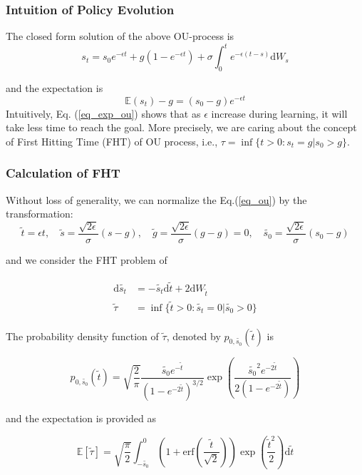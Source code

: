 \documentclass[10pt,hyperref={CJKbookmarks=true},envcountsect,mathserif]{beamer}
\begin{document}
\begin{frame}
	\frametitle{Intuition of Policy Evolution}
	The closed form solution of the above OU-process is 
	\begin{equation}
		s_t = s_0 e^{-\epsilon t} + g (1-e^{-\epsilon t}) + \sigma \int_0^t e^{-\epsilon(t-s)}\mathrm{d}W_s
	\end{equation}

and the expectation is
	\begin{equation}
	\label{eq_exp_ou}
		\mathbb{E}(s_t) - g = (s_0 - g )e^{-\epsilon t}
	\end{equation}
	Intuitively, Eq. (\ref{eq_exp_ou}) shows that as $\epsilon$ increase during learning, it will take less time to reach the goal. More precisely, we are caring about the concept of First Hitting Time (FHT) of OU process, i.e., $\tau = \inf\{{t>0: s_t = g|s_0 > g}\}$. 

\end{frame}

\begin{frame}
	\frametitle{Calculation of FHT}
	Without loss of generality, we can normalize the Eq.(\ref{eq_ou}) by the transformation:
	\begin{equation}
	\label{eq_transform}
		\tilde{t} = \epsilon t, \quad \tilde{s} = \frac{\sqrt{2\epsilon}}{\sigma}(s - g), \quad \tilde{g} = \frac{\sqrt{2\epsilon}}{\sigma}(g - g) = 0, \quad \tilde{s_0} = \frac{\sqrt{2\epsilon}}{\sigma}(s_0 - g)
	\end{equation}
	
	and we consider the FHT problem of 
	
	\begin{align}
	\begin{split}
		\mathrm{d} \tilde{s_t} &= - \tilde{s_t}\mathrm{d}\tilde{t} + 2\mathrm{d} W_{\tilde{t}} \\
		\tilde{\tau} &= \inf\{{\tilde{t}>0: \tilde{s_t} = 0|\tilde{s_0} > 0}\}
	\end{split}
	\end{align}
		
	The probability density function of $\tilde{\tau}$, denoted by $p_{0,\tilde{s_0}}(\tilde{t})$ is 
	
	\begin{equation}
		p_{0,\tilde{s_0}}(\tilde{t}) = \sqrt{\frac{2}{\pi}} \frac{\tilde{s_0}e^{-\tilde{t}}}{(1-e^{-2\tilde{t}})^{3/2}} \exp\left( \frac{\tilde{s_0}^2 e^{-2\tilde{t}}}{2 (1-e^{-2\tilde{t}})} \right)
	\end{equation}
	
	and the expectation is provided as %
	
	\begin{equation}
	\label{eq_expectation_fht_trans}
		\mathbb{E} [\tilde{\tau}] = \sqrt{\frac{\pi}{2}} \int_{-\tilde{s_0}}^0 \left( 1 + \mathrm{erf} \left(\frac{\tilde{t}}{\sqrt{2}} \right)\right) \exp{\left(\frac{\tilde{t}^2}{2}\right)} \mathrm{d}\tilde{t}
	\end{equation}
\end{frame}
\end{document}
